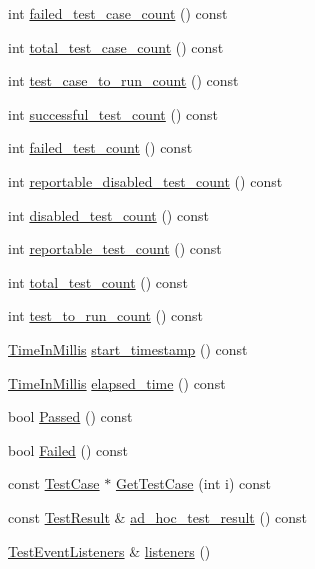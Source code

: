 \begin{DoxyCompactItemize}
\item 
int \hyperlink{classtesting_1_1UnitTest_a1084a93a4b92c6506738e309b0a9eeea}{failed\-\_\-test\-\_\-case\-\_\-count} () const 
\item 
int \hyperlink{classtesting_1_1UnitTest_a6802793a0be9cee17380fdd8c7161fcd}{total\-\_\-test\-\_\-case\-\_\-count} () const 
\item 
int \hyperlink{classtesting_1_1UnitTest_abb7330165eb5be7beac3f7e6ced5fcdd}{test\-\_\-case\-\_\-to\-\_\-run\-\_\-count} () const 
\item 
int \hyperlink{classtesting_1_1UnitTest_a4795d58351f03498d5823a743b0722c5}{successful\-\_\-test\-\_\-count} () const 
\item 
int \hyperlink{classtesting_1_1UnitTest_aeda0f8ca87adf65f634c3d6d9ab98598}{failed\-\_\-test\-\_\-count} () const 
\item 
int \hyperlink{classtesting_1_1UnitTest_aa5eaf98c5d9cc0afe501ac03e6414188}{reportable\-\_\-disabled\-\_\-test\-\_\-count} () const 
\item 
int \hyperlink{classtesting_1_1UnitTest_a4cbd084447b74784d1bb85c1ed4b96d5}{disabled\-\_\-test\-\_\-count} () const 
\item 
int \hyperlink{classtesting_1_1UnitTest_aa32cb4f3cd34564a5c641bd409f8f83b}{reportable\-\_\-test\-\_\-count} () const 
\item 
int \hyperlink{classtesting_1_1UnitTest_a54315b233d354693b9aa1184cf2996de}{total\-\_\-test\-\_\-count} () const 
\item 
int \hyperlink{classtesting_1_1UnitTest_a953a52f89898a04ee4a4e08469407cd3}{test\-\_\-to\-\_\-run\-\_\-count} () const 
\item 
\hyperlink{namespacetesting_a992de1d091ce660f451d1e8b3ce30fd6}{Time\-In\-Millis} \hyperlink{classtesting_1_1UnitTest_adb9fdaf25b601f91bd55606941d05c80}{start\-\_\-timestamp} () const 
\item 
\hyperlink{namespacetesting_a992de1d091ce660f451d1e8b3ce30fd6}{Time\-In\-Millis} \hyperlink{classtesting_1_1UnitTest_a87853e2fe9f0b172467534323cb9d267}{elapsed\-\_\-time} () const 
\item 
bool \hyperlink{classtesting_1_1UnitTest_a4ef49e958702bf741e7eaa4864e28a48}{Passed} () const 
\item 
bool \hyperlink{classtesting_1_1UnitTest_ad7711156d07d6037d8f497e5c385f78d}{Failed} () const 
\item 
const \hyperlink{classtesting_1_1TestCase}{Test\-Case} $\ast$ \hyperlink{classtesting_1_1UnitTest_a7967986c217975d4de70739d28b4109d}{Get\-Test\-Case} (int i) const 
\item 
const \hyperlink{classtesting_1_1TestResult}{Test\-Result} \& \hyperlink{classtesting_1_1UnitTest_ab4ecadf87d00bc67d15553e2998ef81d}{ad\-\_\-hoc\-\_\-test\-\_\-result} () const 
\item 
\hyperlink{classtesting_1_1TestEventListeners}{Test\-Event\-Listeners} \& \hyperlink{classtesting_1_1UnitTest_a1b7387b0b3daa2433ed6b685027bf285}{listeners} ()
\end{DoxyCompactItemize}
